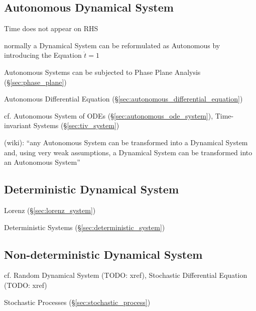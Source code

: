 \subsection{Autonomous Dynamical System}\label{sec:autonomous_dynamical_system}

Time does not appear on RHS

normally a Dynamical System can be reformulated as Autonomous by introducing
the Equation $\dot{t} = 1$

Autonomous Systems can be subjected to Phase Plane Analysis
(\S\ref{sec:phase_plane})

Autonomous Differential Equation (\S\ref{sec:autonomous_differential_equation})

cf. Autonomous System of ODEs (\S\ref{sec:autonomous_ode_system}),
Time-invariant Systems (\S\ref{sec:tiv_system})

(wiki): ``any Autonomous System can be transformed into a Dynamical System and,
using very weak assumptions, a Dynamical System can be transformed into an
Autonomous System''




\subsection{Deterministic Dynamical System}
\label{sec:deterministic_dynamical_system}

Lorenz (\S\ref{sec:lorenz_system})

\fist Deterministic Systems (\S\ref{sec:deterministic_system})



\subsection{Non-deterministic Dynamical System}
\label{sec:nondeterministic_dynamical_system}

cf. Random Dynamical System (TODO: xref), Stochastic Differential Equation
(TODO: xref)

\fist Stochastic Processes (\S\ref{sec:stochastic_process})



